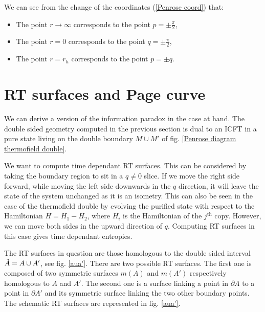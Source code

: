 We can see from the change of the coordinates (\ref{Penrose coord}) that:
\begin{itemize}
  \item The point $r\to\infty$ corresponds to the point $p=\pm\frac{\pi}{2}$,
  \item The point $r=0$ corresponds to the point $q=\pm\frac{\pi}{2}$,
  \item The point $r=r_h$ corresponds to the point $p=\pm q$.
\end{itemize}

\section{RT surfaces and Page curve}

We can derive a version of the information paradox in the case at hand. The double sided geometry computed in the previous section is dual to an ICFT in a pure state living on the double boundary $M\cup M'$ of fig. \ref{Penrose diagram thermofield double}.

We want to compute time dependant RT surfaces. This can be considered by taking the boundary region to sit in a $q\neq0$ slice. If we move the right side forward, while moving the left side downwards in the $q$ direction, it will leave the state of the system unchanged as it is an isometry. This can also be seen in the case of the thermofield double by evolving the purified state with respect to the Hamiltonian $H = H_1-H_2$, where $H_i$ is the Hamiltonian of the $j^\text{th}$ copy. However, we can move both sides in the upward direction of $q$. Computing RT surfaces in this case gives time dependant entropies.

The RT surfaces in question are those homologous to the double sided interval $\Tilde{A}=A\cup A'$, see fig. \ref{aua'}. There are two possible RT surfaces. The first one is composed of two symmetric surfaces $m(A)$ and $m(A')$ respectively homologous to $A$ and $A'$. The second one is a surface linking a point in $\partial A$ to a point in $\partial A'$ and its symmetric surface linking the two other boundary points. The schematic RT surfaces are represented in fig. \ref{aua'}.

